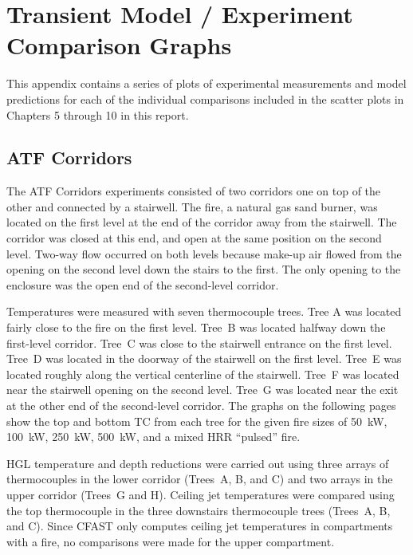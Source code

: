 \chapter{Transient Model / Experiment Comparison Graphs}
\label{sec:Graphs}

This appendix contains a series of plots of experimental measurements and model predictions for each of the individual comparisons included in the scatter plots in Chapters 5 through 10 in this report.

\section{ATF Corridors}

The ATF Corridors experiments consisted of two corridors one on top of the other and connected by a stairwell. The fire, a natural gas sand burner, was located on the first level at the end of the corridor away from the stairwell. The corridor was closed at this end, and open at the same position on the second level. Two-way flow occurred on both levels because make-up air flowed from the opening on the second level down the stairs to the first. The only opening to the enclosure was the open end of the second-level corridor.

Temperatures were measured with seven thermocouple trees. Tree A was located fairly close to the fire on the first level. Tree~B was located halfway down the first-level corridor. Tree~C was close to the stairwell entrance on the first level. Tree~D was located in the doorway of the stairwell on the first level. Tree~E was located roughly along the vertical centerline of the
stairwell. Tree~F was located near the stairwell opening on the second level. Tree~G was located near the exit at the other end of the second-level corridor. The graphs on the following pages show the top and bottom TC from each tree for the given fire sizes of 50~kW, 100~kW, 250~kW, 500~kW, and a mixed HRR ``pulsed'' fire.

HGL temperature and depth reductions were carried out using three arrays of thermocouples in the lower corridor (Trees~A, B, and C) and two arrays in the upper corridor (Trees~G and H).
Ceiling jet temperatures were compared using the top thermocouple in the three downstairs thermocouple trees (Trees~A, B, and C). Since CFAST only computes ceiling jet temperatures in compartments with a fire, no comparisons were made for the upper compartment.

